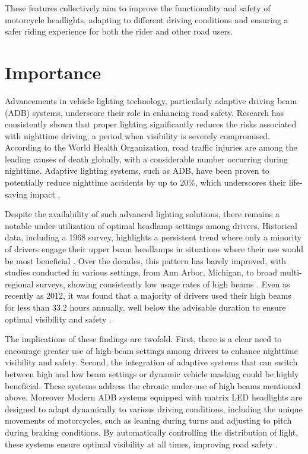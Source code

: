 These features collectively aim to improve the functionality and safety of motorcycle headlights, adapting to different driving conditions and ensuring a safer riding experience for both the rider and other road users.


\section{Importance} 
Advancements in vehicle lighting technology, particularly adaptive driving beam (ADB) systems, underscore their role in enhancing road safety. Research has consistently shown that proper lighting significantly reduces the risks associated with nighttime driving, a period when visibility is severely compromised. According to the World Health Organization, road traffic injuries are among the leading causes of death globally, with a considerable number occurring during nighttime. Adaptive lighting systems, such as ADB, have been proven to potentially reduce nighttime accidents by up to 20\%, which underscores their life-saving impact \cite{WHO:2021, AIIHS:2019}.

Despite the availability of such advanced lighting solutions, there remains a notable under-utilization of optimal headlamp settings among drivers. Historical data, including a 1968 survey, highlights a persistent trend where only a minority of drivers engage their upper beam headlamps in situations where their use would be most beneficial \cite{HareHemion:1968}. Over the decades, this pattern has barely improved, with studies conducted in various settings, from Ann Arbor, Michigan, to broad multi-regional surveys, showing consistently low usage rates of high beams \cite{Sullivan:2004, Mefford:2006}. Even as recently as 2012, it was found that a majority of drivers used their high beams for less than 33.2 hours annually, well below the advisable duration to ensure optimal visibility and safety \cite{Flannagan:2012}.

The implications of these findings are twofold. First, there is a clear need to encourage greater use of high-beam settings among drivers to enhance nighttime visibility and safety. Second, the integration of adaptive systems that can switch between high and low beam settings or dynamic vehicle masking could be highly beneficial. These systems address the chronic under-use of high beams mentioned above. Moreover Modern ADB systems equipped with matrix LED headlights are designed to adapt dynamically to various driving conditions, including the unique movements of motorcycles, such as leaning during turns and adjusting to pitch during braking conditions. By automatically controlling the distribution of light, these systems ensure optimal visibility at all times, improving road safety \cite{Mefford:2006}.

